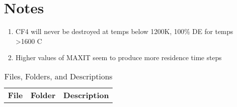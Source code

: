 \documentclass{article}
\begin{document}
\section*{Notes}
\begin{enumerate}
    \item CF4 will never be destroyed at temps below 1200K, 100\% DE for temps >1600 C
    \item Higher values of MAXIT seem to produce more residence time steps
\end{enumerate}
\pagebreak
\begin{table}[H] %
\centering
\renewcommand{\arraystretch}{1.256}
\caption{Files, Folders, and Descriptions}
\begin{tabular}{>{\centering\arraybackslash}m{}>{\scriptsize\centering\arraybackslash}m{}>{\footnotesize\centering\arraybackslash}m{}}\toprule

\normalsize{\textbf{File}}      & \normalsize{\textbf{Folder}}      & \normalsize{\textbf{Description}} \\\cmidrule(r){1-1}\cmidrule(lr){2-2}\cmidrule(l){3-3}


\end{tabular}
\end{table}
\end{document}
